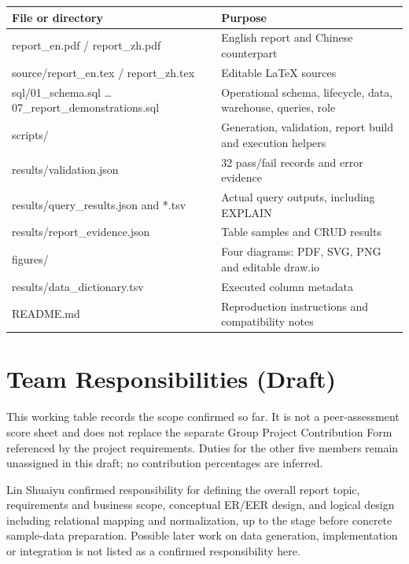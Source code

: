 \documentclass[11pt,a4paper]{article}
\begin{document}
\par\begingroup\small\noindent
\begin{tabularx}{\linewidth}{YY}
\toprule
File or directory & Purpose\\\midrule
report\_\allowbreak{}en.pdf / report\_\allowbreak{}zh.pdf & English report and Chinese counterpart\\
source/report\_\allowbreak{}en.tex / report\_\allowbreak{}zh.tex & Editable LaTeX sources\\
sql/01\_\allowbreak{}schema.sql … 07\_\allowbreak{}report\_\allowbreak{}demonstrations.sql & Operational schema, lifecycle, data, warehouse, queries, role\\
scripts/ & Generation, validation, report build and execution helpers\\
results/validation.json & 32 pass/fail records and error evidence\\
results/query\_\allowbreak{}results.json and *.tsv & Actual query outputs, including EXPLAIN\\
results/report\_\allowbreak{}evidence.json & Table samples and CRUD results\\
figures/ & Four diagrams: PDF, SVG, PNG and editable draw.io\\
results/data\_\allowbreak{}dictionary.tsv & Executed column metadata\\
README.md & Reproduction instructions and compatibility notes\\
\bottomrule
\end{tabularx}
\par\endgroup

\clearpage
\section{Team Responsibilities (Draft)}
This working table records the scope confirmed so far. It is not a peer-assessment score sheet and does not replace the separate Group Project Contribution Form referenced by the project requirements. Duties for the other five members remain unassigned in this draft; no contribution percentages are inferred.

Lin Shuaiyu confirmed responsibility for defining the overall report topic, requirements and business scope, conceptual ER/EER design, and logical design including relational mapping and normalization, up to the stage before concrete sample-data preparation. Possible later work on data generation, implementation or integration is not listed as a confirmed responsibility here.
\end{document}
